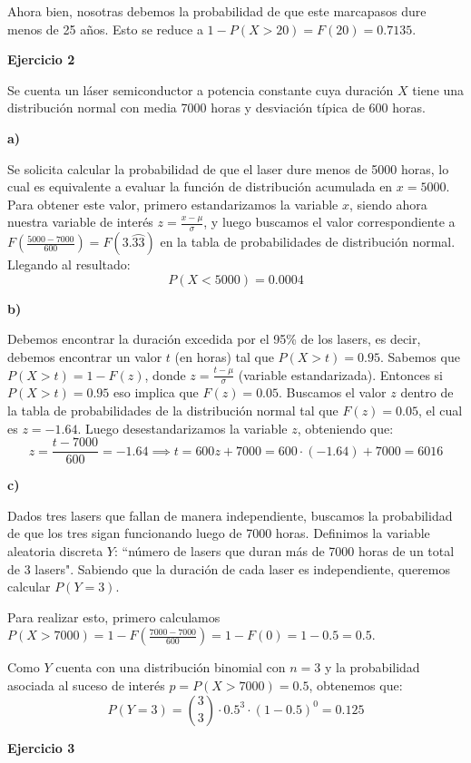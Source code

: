 \documentclass[11pt]{article}
\begin{document}
Ahora bien, nosotras debemos la probabilidad de que este marcapasos dure menos de 25 a\~{n}os. Esto se reduce a $1 - P(X>20) = F(20) = 0.7135.$ 

\textbf{Ejercicio 2}

Se cuenta un láser semiconductor a potencia constante cuya duraci\'on $X$ tiene una distribuci\'on normal con media 7000 horas y desviaci\'on t\'ipica de 600 horas.

\textbf{a)}

Se solicita calcular la probabilidad de que el laser dure menos de 5000 horas, lo cual es equivalente a evaluar la funci\'on de distribuci\'on acumulada en $x=5000$. Para obtener este valor, primero estandarizamos la variable $x$, siendo ahora nuestra variable de inter\'es $z = \frac{x - \mu}{\sigma}$, y luego buscamos el valor correspondiente a $F(\frac{5000-7000}{600}) = F(3.\wideparen{33})$ en la tabla de probabilidades de distribuci\'on normal. 
Llegando al resultado: $$P(X<5000) = 0.0004$$

\textbf{b)}

Debemos encontrar la duraci\'on excedida por el 95\% de los lasers, es decir, debemos encontrar un valor $t$ (en horas) tal que $P(X>t) = 0.95$. Sabemos que $P(X>t) = 1 - F(z)$, donde $z = \frac{t - \mu}{\sigma}$ (variable estandarizada). Entonces si $P(X>t) = 0.95$ eso implica que $F(z) = 0.05$. 
Buscamos el valor $z$ dentro de la tabla de probabilidades de la distribuci\'on normal tal que $F(z) = 0.05$, el cual es $z = -1.64$. Luego desestandarizamos la variable $z$, obteniendo que: 
$$z = \frac{t - 7000}{600} = -1.64 \implies t = 600z + 7000 = 600 \cdot (-1.64) + 7000 = 6016$$

\textbf{c)}

Dados tres lasers que fallan de manera independiente, buscamos la probabilidad de que los tres sigan funcionando luego de 7000 horas. Definimos la variable aleatoria discreta $Y$: ``n\'umero de lasers que duran m\'as de 7000 horas de un total de 3 lasers".
Sabiendo que la duraci\'on de cada laser es independiente, queremos calcular $P(Y=3)$.

Para realizar esto, primero calculamos $P(X>7000) = 1 - F(\frac{7000-7000}{600}) = 1 - F(0) = 1 - 0.5 = 0.5$.

Como $Y$ cuenta con una distribuci\'on binomial con $n=3$ y la probabilidad asociada al suceso de inter\'es $p=P(X>7000)=0.5$, obtenemos que:
$$P(Y=3) = \binom{3}{3} \cdot 0.5^3 \cdot (1 - 0.5)^0 = 0.125$$ 

\textbf{Ejercicio 3}
\end{document}
